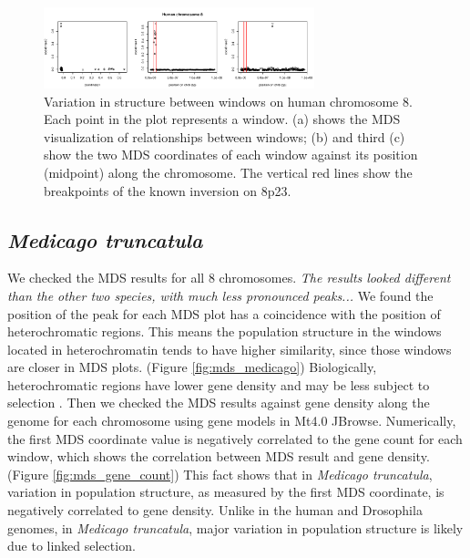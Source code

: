 \documentclass[11pt, oneside]{article}   	%
\newcommand{\plr}[1]{{\em \color{blue} #1}}
\begin{document}
\begin{figure}
    \begin{center}
       \includegraphics[width=0.7\textwidth]{Fig4_POPRES_Together_MDS_plot_chr8_final_abline}
    \end{center}
    \caption{
         Variation in structure between windows on human chromosome 8. Each point in the plot represents a window. 
         (a) shows the MDS visualization of relationships between windows; 
         (b) and third (c) show the two MDS coordinates of each window against its position (midpoint) along the chromosome. 
         The vertical red lines show the breakpoints of the known inversion on 8p23. \citep{antonacci2009characterization}
        \label{fig:mds_human}
    }
\end{figure}


\subsection{\textit{Medicago truncatula}}
We checked the MDS results for all 8 chromosomes. 
\plr{The results looked different than the other two species, with much less pronounced peaks...}
We found the position of the peak for each MDS plot has a coincidence with the position of heterochromatic regions. This means the population structure in the windows located in heterochromatin tends to have higher similarity, since those windows are closer in MDS plots. (Figure \ref{fig:mds_medicago}) Biologically,
heterochromatic regions have lower gene density and may be less subject to selection \citep{kulikova2001integration,paape2013selection}. Then we checked the MDS results against gene density along the genome for each chromosome using gene models in Mt4.0 JBrowse. Numerically, the first MDS coordinate value is negatively correlated to the gene count for each window, which shows the correlation between MDS result and gene density. (Figure \ref{fig:mds_gene_count}) 
This fact shows that in \textit{Medicago truncatula}, variation in population structure, as measured by the first MDS coordinate, is negatively correlated to gene density. 
Unlike in the human and Drosophila genomes, in \textit{Medicago truncatula}, major variation in population structure is likely due to linked selection. 
\end{document}
